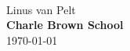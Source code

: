 \begingroup

\newpage
\thispagestyle{empty}


~\vfill

\printMyTitle

\begin{flushleft}
  {\LARGE Linus van Pelt}\\
  {\normalsize\textbf{Charle Brown School}}\\
  {\scriptsize\today}
\end{flushleft}

~\vfill

\endgroup
